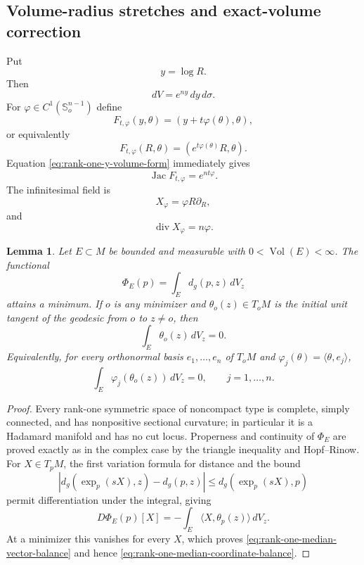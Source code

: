 \documentclass[11pt,reqno]{amsart}
\numberwithin{equation}{section}
\newtheorem{lemma}[theorem]{Lemma}
\theoremstyle{definition}
\theoremstyle{remark}
\newcommand{\Vol}{\operatorname{Vol}}
\newcommand{\Jac}{\operatorname{Jac}}
\newcommand{\diver}{\operatorname{div}}
\begin{document}
\subsection{Volume-radius stretches and exact-volume correction}

Put
\[
y=\log R.
\]
Then
\begin{equation}
dV=e^{ny}\,dy\,d\sigma.
\label{eq:rank-one-y-volume-form}
\end{equation}
For $\varphi\in C^1(\mathbb S_o^{n-1})$ define
\[
F_{t,\varphi}(y,\theta)
=
(y+t\varphi(\theta),\theta),
\]
or equivalently
\[
F_{t,\varphi}(R,\theta)
=
(e^{t\varphi(\theta)}R,\theta).
\]
Equation \eqref{eq:rank-one-y-volume-form} immediately gives
\[
\Jac F_{t,\varphi}=e^{nt\varphi}.
\]
The infinitesimal field is
\[
X_\varphi
=
\varphi R\partial_R,
\]
and
\[
\diver X_\varphi=n\varphi.
\]

\begin{lemma}
\label{lem:rank-one-median-balance}
Let $E\subset M$ be bounded and measurable with $0<\Vol(E)<\infty$.  The
functional
\[
\Phi_E(p)=\int_E d_g(p,z)\,dV_z
\]
attains a minimum.  If $o$ is any minimizer and
$\theta_o(z)\in T_oM$ is the initial unit tangent of the geodesic from $o$ to
$z\ne o$, then
\begin{equation}
\int_E\theta_o(z)\,dV_z=0.
\label{eq:rank-one-median-vector-balance}
\end{equation}
Equivalently, for every orthonormal basis $e_1,\ldots,e_n$ of $T_oM$ and
$\varphi_j(\theta)=\langle\theta,e_j\rangle$,
\begin{equation}
\int_E\varphi_j(\theta_o(z))\,dV_z=0,
\qquad j=1,\ldots,n.
\label{eq:rank-one-median-coordinate-balance}
\end{equation}
\end{lemma}

\begin{proof}
Every rank-one symmetric space of noncompact type is complete, simply
connected, and has nonpositive sectional curvature; in particular it is a
Hadamard manifold and has no cut locus.  Properness and continuity of
$\Phi_E$ are proved exactly as in the complex case by the triangle inequality
and Hopf--Rinow.  For $X\in T_pM$, the first variation formula for distance and
the bound
\[
|d_g(\exp_p(sX),z)-d_g(p,z)|\le d_g(\exp_p(sX),p)
\]
permit differentiation under the integral, giving
\[
D\Phi_E(p)[X]
=-\int_E\langle X,\theta_p(z)\rangle\,dV_z.
\]
At a minimizer this vanishes for every $X$, which proves
\eqref{eq:rank-one-median-vector-balance} and hence
\eqref{eq:rank-one-median-coordinate-balance}.
\end{proof}
\end{document}
